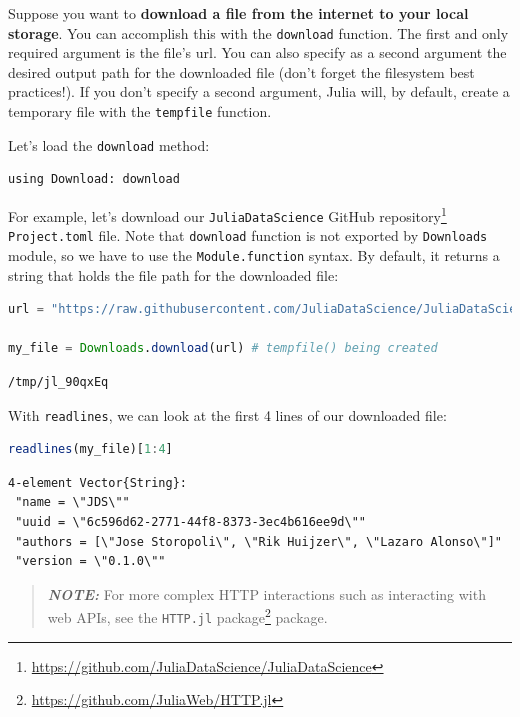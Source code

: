 \documentclass[
  notoc %
]{tufte-book}
\DeclareRobustCommand{\href}[2]{#2\footnote{\url{#1}}}
\newcommand{\passthrough}[1]{#1}
\begin{document}
Suppose you want to \textbf{download a file from the internet to your
local storage}. You can accomplish this with the
\passthrough{\lstinline!download!} function. The first and only required
argument is the file's url. You can also specify as a second argument
the desired output path for the downloaded file (don't forget the
filesystem best practices!). If you don't specify a second argument,
Julia will, by default, create a temporary file with the
\passthrough{\lstinline!tempfile!} function.

Let's load the \passthrough{\lstinline!download!} method:

\begin{lstlisting}
using Download: download
\end{lstlisting}

For example, let's download our
\href{https://github.com/JuliaDataScience/JuliaDataScience}{\passthrough{\lstinline!JuliaDataScience!}
GitHub repository} \passthrough{\lstinline!Project.toml!} file. Note
that \passthrough{\lstinline!download!} function is not exported by
\passthrough{\lstinline!Downloads!} module, so we have to use the
\passthrough{\lstinline!Module.function!} syntax. By default, it returns
a string that holds the file path for the downloaded file:

\begin{lstlisting}[language=Julia]
url = "https://raw.githubusercontent.com/JuliaDataScience/JuliaDataScience/main/Project.toml"

my_file = Downloads.download(url) # tempfile() being created
\end{lstlisting}

\begin{lstlisting}[language=Output]
/tmp/jl_90qxEq
\end{lstlisting}

With \passthrough{\lstinline!readlines!}, we can look at the first 4
lines of our downloaded file:

\begin{lstlisting}[language=Julia]
readlines(my_file)[1:4]
\end{lstlisting}

\begin{lstlisting}[language=Output]
4-element Vector{String}:
 "name = \"JDS\""
 "uuid = \"6c596d62-2771-44f8-8373-3ec4b616ee9d\""
 "authors = [\"Jose Storopoli\", \"Rik Huijzer\", \"Lazaro Alonso\"]"
 "version = \"0.1.0\""
\end{lstlisting}

\begin{quote}
\textbf{\emph{NOTE:}} For more complex HTTP interactions such as
interacting with web APIs, see the
\href{https://github.com/JuliaWeb/HTTP.jl}{\passthrough{\lstinline!HTTP.jl!}
package} package.
\end{quote}
\end{document}
